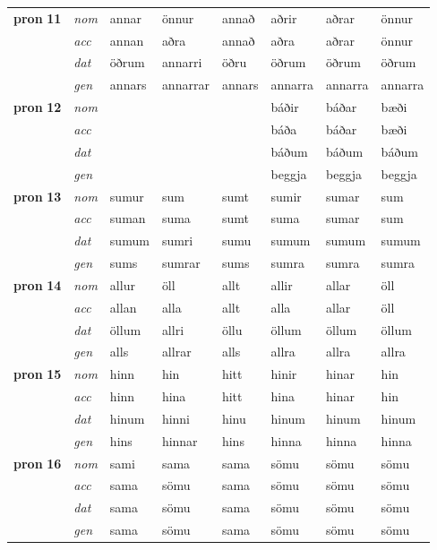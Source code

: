 \begin{longtable}[l]{X>{\footnotesize\itshape}XXXXXXX}
\multirow{3}{*}{{{\textbf{pron} \Large{\textbf{11}}}}}  & nom & annar & önnur    & annað & aðrir & aðrar & önnur \\*
  & acc &  annan  & aðra   & annað & aðra & aðrar & önnur \\*
&  dat & öðrum & annarri   & öðru & öðrum & öðrum & öðrum \\*
  & gen & annars  & annarrar  & annars & annarra & annarra & annarra\\
\cmidrule{1-8}

\multirow{3}{*}{{{\textbf{pron} \Large{\textbf{12}}}}}  & nom &  &     &  & báðir & báðar & bæði \\*
  & acc &    &    &  & báða & báðar & bæði \\*
&  dat &  &    &  & báðum & báðum & báðum \\*
  & gen &   &   &  & beggja & beggja & beggja\\
\cmidrule{1-8}

\multirow{3}{*}{{{\textbf{pron} \Large{\textbf{13}}}}}  & nom & sumur & sum    & sumt & sumir & sumar & sum \\*
  & acc &  suman  & suma   & sumt & suma & sumar & sum \\*
&  dat & sumum & sumri   & sumu & sumum & sumum & sumum \\*
  & gen & sums  & sumrar  & sums & sumra & sumra & sumra\\
\cmidrule{1-8}

\multirow{3}{*}{{{\textbf{pron} \Large{\textbf{14}}}}}  & nom & allur & öll    & allt & allir & allar & öll \\*
  & acc &  allan  & alla   & allt & alla & allar & öll \\*
&  dat & öllum & allri   & öllu & öllum & öllum & öllum \\*
  & gen & alls  & allrar  & alls & allra & allra & allra\\
\cmidrule{1-8}

\multirow{3}{*}{{{\textbf{pron} \Large{\textbf{15}}}}}  & nom & hinn & hin    & hitt & hinir & hinar & hin \\*
  & acc &  hinn  & hina   & hitt & hina & hinar & hin \\*
&  dat & hinum & hinni   & hinu & hinum & hinum & hinum \\*
  & gen & hins  & hinnar  & hins & hinna & hinna & hinna\\
\cmidrule{1-8}

\multirow{3}{*}{{{\textbf{pron} \Large{\textbf{16}}}}}  & nom & sami & sama    & sama & sömu & sömu & sömu \\*
  & acc &  sama  & sömu   & sama & sömu & sömu & sömu \\*
&  dat & sama & sömu   & sama & sömu & sömu & sömu \\*
  & gen & sama  & sömu  & sama & sömu & sömu & sömu\\
\bottomrule
\end{longtable}

